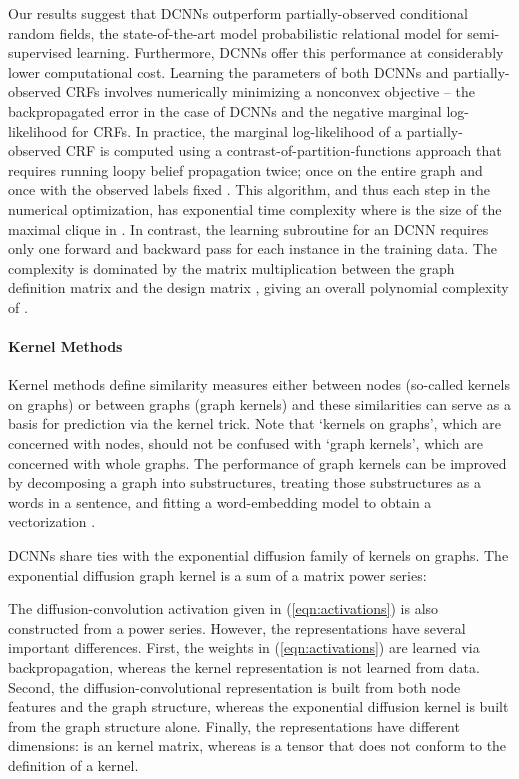\documentclass{article}
\begin{document}
Our results suggest that DCNNs outperform partially-observed conditional random fields, the state-of-the-art model probabilistic relational model for semi-supervised learning.  Furthermore, DCNNs offer this performance at considerably lower computational cost.  Learning the parameters of both DCNNs and partially-observed CRFs involves numerically minimizing a nonconvex objective -- the backpropagated error in the case of DCNNs and the negative marginal log-likelihood for CRFs.  In practice, the marginal log-likelihood of a partially-observed CRF is computed using a contrast-of-partition-functions approach that requires running loopy belief propagation twice; once on the entire graph and once with the observed labels fixed \cite{Verbeek:2007tb}.  This algorithm, and thus each step in the numerical optimization, has exponential time complexity  where  is the size of the maximal clique in  \cite{Cohn:2006cv}.  In contrast, the learning subroutine for an DCNN requires only one forward and backward pass for each instance in the training data.   The complexity is dominated by the matrix multiplication between the graph definition matrix  and the design matrix , giving an overall polynomial complexity of .  



\paragraph{Kernel Methods}  Kernel methods define similarity measures either between nodes (so-called kernels on graphs)  \cite{Fouss:2012bf} or between graphs (graph kernels) and these similarities can serve as a basis for prediction via the kernel trick. Note that `kernels on graphs', which are concerned with nodes, should not be confused with `graph kernels', which are concerned with whole graphs.  The performance of graph kernels can be improved by decomposing a graph into substructures, treating those substructures as a words in a sentence, and fitting a word-embedding model to obtain a vectorization \cite{Yanardag:2015fm}. 

DCNNs share ties with the exponential diffusion family of kernels on graphs.  The exponential diffusion graph kernel  is a sum of a matrix power series:

The diffusion-convolution activation given in (\ref{eqn:activations}) is also constructed from a power series.  However, the representations have several important differences.  First, the weights in (\ref{eqn:activations}) are learned via backpropagation, whereas the kernel representation is not learned from data.  Second, the diffusion-convolutional representation is built from both node features and the graph structure, whereas the exponential diffusion kernel is built from the graph structure alone.  Finally, the representations have different dimensions:  is an  kernel matrix, whereas  is a  tensor that does not conform to the definition of a kernel.
\end{document}
